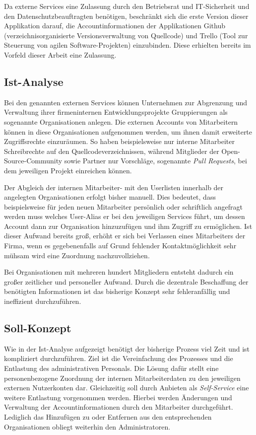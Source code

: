 Da externe Services eine Zulassung durch den Betriebsrat und IT-Sicherheit und den Datenschutzbeauftragten
benötigen, beschränkt sich die erste Version dieser Applikation darauf, die Accountinformationen der
Applikationen Github (verzeichnisorganisierte Versionsverwaltung von Quellcode) und Trello
(Tool zur Steuerung von agilen Software-Projekten) einzubinden. Diese erhielten bereits im Vorfeld
dieser Arbeit eine Zulassung.

\subsection{Ist-Analyse}
\label{sec:Ist-Analyse}
Bei den genannten externen Services können Unternehmen zur Abgrenzung und
Verwaltung ihrer firmeninternen Entwicklungsprojekte Gruppierungen als sogenannte Organisationen anlegen.
Die externen Accounts von Mitarbeitern können in diese Organisationen aufgenommen werden,
um ihnen damit erweiterte Zugriffsrechte einzuräumen.
So haben beispielsweise nur interne Mitarbeiter Schreibrechte auf den Quellcodeverzeichnissen, während
Mitglieder der Open-Source-Community sowie Partner nur Vorschläge, sogenannte
\textit{Pull Requests}, bei dem jeweiligen Projekt einreichen können.

Der Abgleich der internen Mitarbeiter- mit den Userlisten innerhalb der angelegten Organisationen
erfolgt bisher manuell. Dies bedeutet, dass beispielsweise für jeden neuen
Mitarbeiter persönlich oder schriftlich angefragt werden muss welches User-Alias er bei den
jeweiligen Services führt, um dessen Account dann zur Organisation hinzuzufügen und ihm
Zugriff zu ermöglichen. Ist dieser Aufwand bereits groß, erhöht er sich bei Verlassen eines Mitarbeiters
der Firma, wenn es gegebenenfalls auf Grund fehlender Kontaktmöglichkeit sehr mühsam wird eine Zuordnung
nachzuvollziehen.

Bei Organisationen mit mehreren hundert Mitgliedern entsteht dadurch ein großer zeitlicher und
personeller Aufwand. Durch die dezentrale Beschaffung der benötigten Informationen ist das bisherige
Konzept sehr fehleranfällig und ineffizient durchzuführen.

\subsection{Soll-Konzept}
\label{sec:Soll-Konzept}
Wie in der Ist-Analyse aufgezeigt benötigt der bisherige Prozess viel Zeit und ist kompliziert
durchzuführen. Ziel ist die Vereinfachung des Prozesses und die Entlastung des administrativen Personals.
Die Lösung dafür stellt eine personenbezogene Zuordnung der internen Mitarbeiterdaten zu den jeweiligen
externen Nutzerkonten dar. Gleichzeitig soll durch Anbieten als \textit{Self-Service} eine weitere
Entlastung vorgenommen werden. Hierbei werden Änderungen und Verwaltung der Accountinformationen durch den Mitarbeiter
durchgeführt. Lediglich das Hinzufügen zu oder Entfernen aus den entsprechenden Organisationen obliegt weiterhin den
Administratoren.


